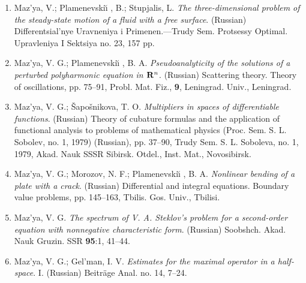 \documentclass{article}
\begin{document}
\begin{enumerate}
\item Maz'ya, V.; Plamenevski{\u\i} , B.; Stupjalis, L. {\it The
three-dimensional problem of the steady-state motion of
a fluid with a free surface}. (Russian) Differentsial'nye Uravneniya i
Primenen.---Trudy Sem. Protsessy Optimal. Upravleniya I
Sektsiya no. 23, 157 pp.
\item Maz'ya, V. G.; Plamenevski{\u\i} , B. A. {\it Pseudoanalyticity
of
the solutions of a perturbed polyharmonic
equation in ${\bf R}\sp{n}$}. (Russian) Scattering theory. Theory of
oscillations, pp. 75--91, Probl. Mat. Fiz., {\bf 9},
Leningrad. Univ., Leningrad.
\item Maz'ya, V. G.; \v Sapo\v snikova, T. O. {\it Multipliers in
spaces of
differentiable functions}.
(Russian) Theory of cubature formulas and the application of
functional
analysis to problems of mathematical physics (Proc. Sem. S.
L. Sobolev, no. 1, 1979) (Russian), pp. 37--90, Trudy Sem. S. L.
Soboleva,
no. 1, 1979, Akad. Nauk SSSR Sibirsk. Otdel., Inst.
Mat., Novosibirsk.
\item Maz'ya, V. G.; Morozov, N. F.; Plamenevski{\u\i} , B. A. {\it
Nonlinear bending of a plate with a crack}.
(Russian) Differential and integral equations. Boundary value
problems, pp.
145--163, Tbilis. Gos. Univ., Tbilisi.
\item Maz'ya, V. G. {\it The spectrum of V. A. Steklov's problem for a
second-order equation with
nonnegative characteristic form}. (Russian) Soobshch. Akad. Nauk
Gruzin.
SSR {\bf 95}:1, 41--44.
\item Maz'ya, V. G.; Gel'man, I. V. {\it Estimates for the maximal
operator
in a half-space}. I.
(Russian) Beitr{\"a}ge Anal. no. 14, 7--24.
\hfill\break


\end{enumerate}
\end{document}

